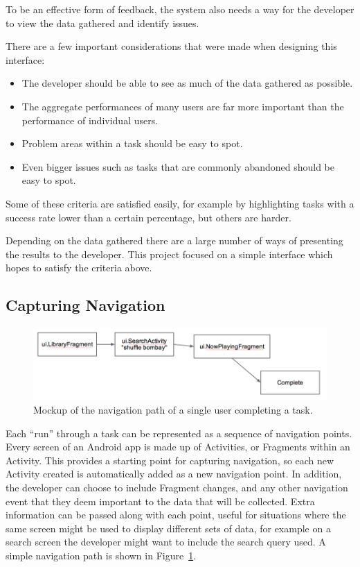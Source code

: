 To be an effective form of feedback, the system also needs a way for the developer to view the data gathered and identify issues.

There are a few important considerations that were made when designing this interface:

\begin{itemize}
  \item The developer should be able to see as much of the data gathered as possible.
  \item The aggregate performances of many users are far more important than the performance of individual users.
  \item Problem areas within a task should be easy to spot.
  \item Even bigger issues such as tasks that are commonly abandoned should be easy to spot.
\end{itemize}

Some of these criteria are satisfied easily, for example by highlighting tasks with a success rate lower than a certain percentage, but others are harder.

Depending on the data gathered there are a large number of ways of presenting the results to the developer. This project focused on a simple interface which hopes to satisfy the criteria above.

\subsection{Capturing Navigation}

\begin{figure}[h]
 \centering
 \includegraphics[width=\textwidth]{images/single-path}
 \caption{Mockup of the navigation path of a single user completing a task.}
 \label{fig:task-navigation}
\end{figure}

Each ``run'' through a task can be represented as a sequence of navigation points. Every screen of
an Android app is made up of Activities, or Fragments within an Activity. This provides a starting
point for capturing navigation, so each new Activity created is automatically added as a new navigation point. In addition, 
the developer can choose to include Fragment changes, and any other navigation event that they deem important to 
the data that will be collected. Extra information can be passed along with each point, useful for situations
where the same screen might be used to display different sets of data, for example on a search screen the
developer might want to include the search query used. A simple navigation path is 
shown in Figure~\ref{fig:task-navigation}.

